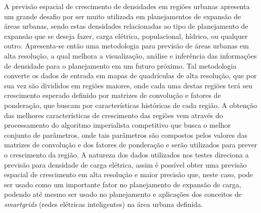 \setlength{\absparsep}{18pt} %
\begin{resumo}

A previsão espacial de crescimento de densidades em regiões urbanas apresenta um grande desafio por ser muito utilizada em planejamentos de expansão de áreas urbanas, sendo estas densidades relacionadas ao tipo de planejamento de expansão que se deseja fazer, carga elétrica, populacional, hídrico, ou qualquer outro. Apresenta-se então uma metodologia para previsão de áreas urbanas em alta resolução, a qual melhora a visualização, análise e inferência das informações de densidade para o planejamento em um futuro próximo. Tal metodologia converte os dados de entrada em mapas de quadrículas de alta resolução, que por sua vez são divididos em regiões maiores, onde cada uma destas regiões terá seu crescimento esperado definido por matrizes de convolução e fatores de ponderação, que buscam por características históricas de cada região. A obtenção das melhores características de crescimento das regiões vem através do processamento do algoritmo imperialista competitivo que busca o melhor conjunto de parâmetros, onde tais parâmetros são compostos pelos valores das matrizes de convolução e dos fatores de ponderação e serão utilizados para prever o crescimento da região. A natureza dos dados utilizados nos testes direciona a previsão para densidade de carga elétrica, assim é possível obter uma previsão espacial de crescimento em alta resolução e maior precisão que, neste caso, pode ser usado como um importante fator no planejamento de expansão de carga, podendo até mesmo ser usado no planejamento e aplicações dos conceitos de \emph{smartgrids} (redes elétricas inteligentes) na área urbana definida.

\end{resumo}

